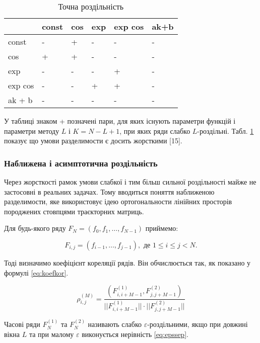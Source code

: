 \begin{table}[h]
	\captionstyle{ \raggedright}
	\caption{Точна роздільність}\label{tab:exactsep}
	\centering
	\begin{tabular}{| p{} | p{} | p{} | p{} | p{} | p{} |}
	\hline
	 & const & cos & exp & exp cos & ak+b \\
	\hline
	const & - & + & - & - & - \\
	\hline
	cos & + & + & - & - & - \\
	\hline
	exp & - & - & - & + & - \\
	\hline
	exp cos & - & - & + & + & - \\
	\hline
	ak + b & - & - & - & - & - \\
	\hline
	\end{tabular}
\end{table}

У таблиці знаком + позначені пари, для яких існують параметри функцій і параметри методу $L$ і $K = N - L + 1$, при яких ряди слабко $L$-роздільні. Табл. \ref{tab:exactsep} показує що умови разделимости є досить жорсткими [15].

\subsubsection{Наближена і асимптотична роздільність}

Через жорсткості рамок умови слабкої і тим більш сильної роздільності майже не застосовні в реальних задачах. Тому вводиться поняття наближеною разделимости, яке використовує ідею ортогональности лінійних просторів породжених стовпцями траєкторних матриць.

Для будь-якого ряду $F_{N} = (f_{0}, f_{1}, \dots, f_{N-1})$ приймемо:

\[
F_{i,j} = (f_{i-1}, \dots, f_{j-1}), \text{ де } 1 \le i \le j < N.
\]

Тоді визначимо коефіцієнт кореляції рядів. Він обчислюється так, як показано у формулі \ref{eq:koefkor}.

\begin{equation}\label{eq:koefkor}
\rho_{i,j}^{(M)} = \frac{(F_{i,i+M-1}^{(1)}, F_{j,j+M-1}^{(2)})}{||F_{i,i+M-1}^{(1)}|| \cdot ||F_{j,j+M-1}^{(2)}||}
\end{equation}

Часові ряди $F_{N}^{(1)}$ та $F_{N}^{(2)}$ називають слабко $\varepsilon$-роздільними, якщо при довжині вікна $L$ та при малому $\varepsilon$ виконується нерівність \ref{eq:epssep}.

